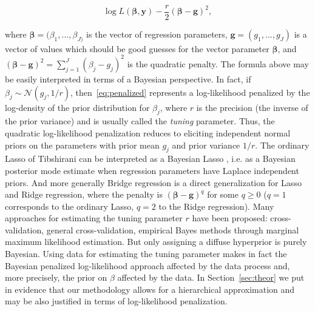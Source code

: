 \documentclass{statsoc}
\begin{document}
\begin{equation}
\log L(\bm{\beta}, \bm{y}) -\frac{r}{2}(\bm{\beta}-\bm{g})^{2},
\label{eq:penalized}
\end{equation}

where $\bm{\beta}=(\beta_{1},...,\beta_{J)}$ is the vector of regression parameters, $\bm{g}=(g_{1},...,g_{J})$ is a vector of values which should be good guesses for the vector parameter $\bm{\beta}$, and $(\bm{\beta}-\bm{g})^{2}= \sum_{j=1}^{J}(\beta_{j}-g_{j})^{2}$ is the quadratic penalty. The formula above may be easily interpreted in terms of a Bayesian perspective. In fact, if $\beta_{j} \sim \mathcal{N}(g_{j}, 1/r)$, then~\eqref{eq:penalized} represents a log-likelihood penalized by the log-density of the prior distribution for $\beta_{j}$, where $r$ is the precision (the inverse of the prior variance) and is usually called the \textit{tuning} parameter. Thus, the quadratic log-likelihood penalization reduces to eliciting independent normal priors on the parameters with prior mean $g_{j}$ and prior variance $1/r$. The ordinary Lasso of Tibshirani can be interpreted as a Bayesian Lasso \citep{park2008bayesian}, i.e. as a Bayesian posterior mode estimate when regression parameters have Laplace independent priors. And more generally Bridge regression is a direct generalization for Lasso and Ridge regression, where the penalty is $(\bm{\beta}-\bm{g})^{q}$ for some $q \ge 0$ ($q=1$ corresponds to the ordinary Lasso, $q=2$ to the Ridge regression). Many approaches for estimating the tuning parameter $r$ have been proposed: cross-validation, general cross-validation, empirical Bayes methods through marginal maximum likelihood estimation. But only assigning a diffuse hyperprior is purely Bayesian. Using data for estimating the tuning parameter makes in fact the Bayesian penalized log-likelihood approach affected by the data process and, more precisely, the prior on $\beta$ affected by the data. In Section~\ref{sec:theor} we put in evidence that our methodology allows for a hierarchical approximation and may be also justified in terms of log-likelihood penalization. 
 
%
%
\end{document}
